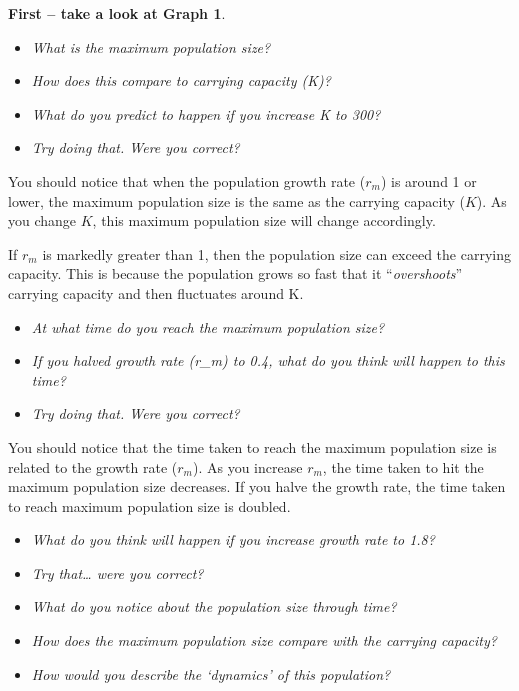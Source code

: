 \documentclass[
  a4paper]{book}
\providecommand{\tightlist}{%
  \setlength{\itemsep}{0pt}\setlength{\parskip}{0pt}}
\begin{document}
\textbf{First -- take a look at Graph 1}.

\begin{itemize}
\tightlist
\item
  \emph{What is the maximum population size?}
\item
  \emph{How does this compare to carrying capacity (K)?}
\item
  \emph{What do you predict to happen if you increase K to 300?}
\item
  \emph{Try doing that. Were you correct?}
\end{itemize}

You should notice that when the population growth rate (\(r_m\)) is around 1 or lower, the maximum population size is the same as the carrying capacity (\(K\)). As you change \(K\), this maximum population size will change accordingly.

If \(r_m\) is markedly greater than 1, then the population size can exceed the carrying capacity. This is because the population grows so fast that it ``\emph{overshoots}'' carrying capacity and then fluctuates around K.

\begin{itemize}
\tightlist
\item
  \emph{At what time do you reach the maximum population size?}
\item
  \emph{If you halved growth rate (r\_m) to 0.4, what do you think will happen to this time? }
\item
  \emph{Try doing that. Were you correct?}
\end{itemize}

You should notice that the time taken to reach the maximum population size is related to the growth rate (\(r_m\)). As you increase \(r_m\), the time taken to hit the maximum population size decreases. If you halve the growth rate, the time taken to reach maximum population size is doubled.

\begin{itemize}
\tightlist
\item
  \emph{What do you think will happen if you increase growth rate to 1.8?}
\item
  \emph{Try that\ldots{} were you correct?}
\item
  \emph{What do you notice about the population size through time?}
\item
  \emph{How does the maximum population size compare with the carrying capacity?}
\item
  \emph{How would you describe the `dynamics' of this population?}
\end{itemize}
\end{document}

